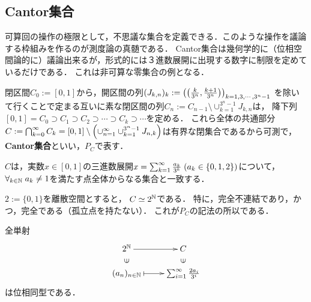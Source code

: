 \documentclass[uplatex, dvipdfmx]{jsreport}
\begin{document}
\subsection{Cantor集合}

\begin{tcolorbox}[colframe=ForestGreen, colback=ForestGreen!10!white,breakable,colbacktitle=ForestGreen!40!white,coltitle=black,fonttitle=\bfseries\sffamily,
    title=連続体濃度のLebesgue零集合]
    可算回の操作の極限として，不思議な集合を定義できる．このような操作を議論する枠組みを作るのが測度論の真髄である．
    Cantor集合は幾何学的に（位相空間論的に）議論出来るが，形式的には３進数展開に出現する数字に制限を定めているだけである．
    これは非可算な零集合の例となる．
\end{tcolorbox}

\begin{definition}
    閉区間$C_0:=[0,1]$から，開区間の列$(J_{k,n})_{k}:=\left(\left(\frac{k}{3^n},\frac{k+1}{3^n}\right)\right)_{k=1,3,\cdots,3^n-1}$
    を除いて行くことで定まる互いに素な閉区間の列$C_n:=C_{n-1}\setminus\cup_{k=1}^{3^n-1}J_{k,n}$は，
    降下列$[0,1]=C_0\supset C_1\supset C_2\supset\cdots\supset C_k\supset\cdots$を定める．
    これら全体の共通部分$C:=\bigcap^\infty_{k=0}C_k=[0,1]\setminus\left(\cup_{n=1}^\infty\cup_{k=1}^{3^n-1}J_{n,k}\right)$は有界な閉集合であるから可測で，\textbf{Cantor集合}といい，$P_C$で表す．
\end{definition}

\begin{lemma}[三進数展開としての特徴付け]
    $C$は，実数$x\in[0,1]$の三進数展開$x=\sum_{k=1}^\infty\frac{a_k}{3^k}\;(a_k\in\{0,1,2\})$について，$\forall_{k\in\mathbb{N}}\;a_k\ne 1$を満たす点全体からなる集合と一致する．
\end{lemma}

\begin{proposition}[Cantor空間の位相]
    $2:=\{0,1\}$を離散空間とすると，
    $C\simeq 2^{\mathbb{N}}$である．
    特に，完全不連結であり，かつ，完全である（孤立点を持たない）．
    これが$P_C$の記法の所以である．
\end{proposition}
\begin{Proof}
    全単射
    \[\xymatrix@R-2pc{
        2^\N\ar[r]&C\\
        \rotatebox[origin=c]{90}{$\in$}&\rotatebox[origin=c]{90}{$\in$}\\
        (a_n)_{n\in\N}\ar@{|->}[r]&\sumi\frac{2a_i}{3^i}
    }\]
    は位相同型である．
\end{Proof}
\end{document}
